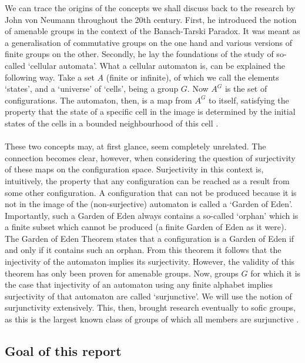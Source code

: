 \documentclass[titlepage, a4paper]{article}
\theoremstyle{remark}
\begin{document}
We can trace the origins of the concepts we shall discuss back to the research by John von Neumann throughout the 20th century. First, he introduced the notion of amenable groups in the context of the Banach-Tarski Paradox. It was meant as a generalisation of commutative groups on the one hand and various versions of finite groups on the other. Secondly, he lay the foundations of the study of so-called ‘cellular automata’. What a cellular automaton is, can be explained the following way. Take a set $A$ (finite or infinite), of which we call the elements ‘states’, and a ‘universe’ of ‘cells’, being a group $G$. Now $A^G$  is the set of configurations. The automaton, then, is a map from $A^G$ to itself, satisfying the property that the state of a specific cell in the image is determined by the initial states of the cells in a bounded neighbourhood of this cell \cite{vonNeumann_1966} .\\
\\
These two concepts may, at first glance, seem completely unrelated. The connection becomes clear, however, when considering the question of surjectivity of these maps on the configuration space. Surjectivity in this context is, intuitively, the property that any configuration can be reached as a result from some other configuration. A configuration that can not be produced because it is not in the image of the (non-surjective) automaton is called a ‘Garden of Eden’. Importantly, such a Garden of Eden always contains a so-called ‘orphan’ which is a finite subset which cannot be produced (a finite Garden of Eden as it were). The Garden of Eden Theorem states that a configuration is a Garden of Eden if and only if it contains such an orphan. From this theorem it follows that the injectivity of the automaton implies its surjectivity. However, the validity of this theorem has only been proven for amenable groups.
Now, groups $G$ for which it is the case that injectivity of an automaton using any finite alphabet implies surjectivity of that automaton are called ‘surjunctive’. We will use the notion of surjunctivity extensively. This, then, brought research eventually to sofic groups, as this is the largest known class of groups of which all members are surjunctive \cite{ceccherini-silberstein_coornaert_2010}.  

\subsection*{Goal of this report}
\end{document}
